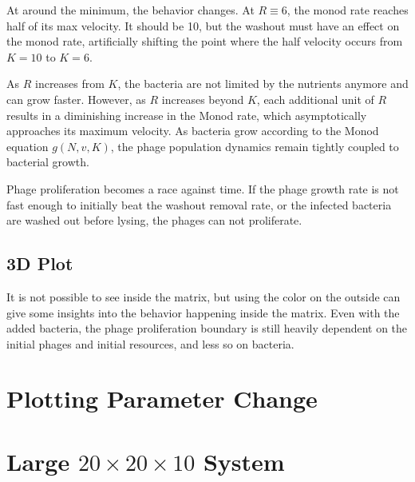 At around the minimum, the behavior changes. 
At $R\equiv 6$, the monod rate reaches half of its max velocity. 
It should be 10, but the washout must have an effect on the monod rate, artificially shifting the point where the half velocity occurs from $K=10$ to $K=6$. 

As $R$ increases from $K$, the bacteria are not limited by the nutrients anymore and can grow faster. 
However, as $R$ increases beyond $K$, each additional unit of $R$ results in a diminishing increase in the Monod rate, which asymptotically approaches its maximum velocity. 
As bacteria grow according to the Monod equation $g(N, v, K)$, the phage population dynamics remain tightly coupled to bacterial growth. 

Phage proliferation becomes a race against time. 
If the phage growth rate is not fast enough to initially beat the washout removal rate, or the infected bacteria are washed out before lysing, the phages can not proliferate. 

\subsection{3D Plot}
It is not possible to see inside the matrix, but using the color on the outside can give some insights into the behavior happening inside the matrix. 
Even with the added bacteria, the phage proliferation boundary is still heavily dependent on the initial phages and initial resources, and less so on bacteria. 

\section{Plotting Parameter Change}

\section{Large $20\times20\times10$ System}